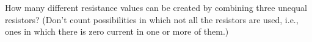 How many different resistance values can be created by
        combining three unequal resistors? (Don't count possibilities
        in which not all the resistors are used, i.e., ones in which there
        is zero current in one or more of them.)
